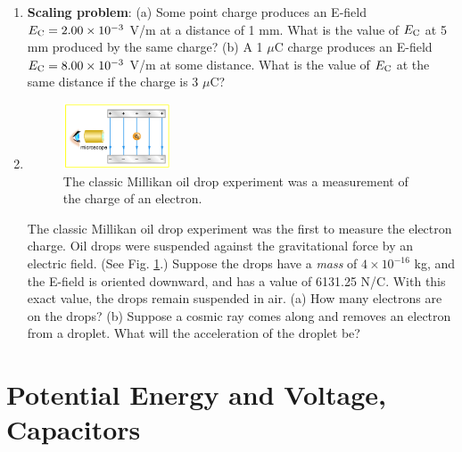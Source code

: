 \documentclass[10pt]{article}
\begin{document}
\begin{enumerate}
\item \textbf{Scaling problem}: (a) Some point charge produces an E-field $E_{\rm C} = 2.00 \times 10^{-3}$ V/m at a distance of 1 mm. What is the value of $E_{\rm C}$ at 5 mm produced by the same charge? (b) A 1 $\mu$C charge produces an E-field $E_{\rm C} = 8.00 \times 10^{-3}$ V/m at some distance.  What is the value of $E_{\rm C}$ at the same distance if the charge is 3 $\mu$C? \\ \vspace{1cm}
\item 
\begin{figure}
\centering
\includegraphics[width=0.3\textwidth]{figures/mill.jpeg}
\caption{\label{fig:mill} The classic Millikan oil drop experiment was a measurement of the charge of an electron.}
\end{figure}
The classic Millikan oil drop experiment was the first to measure the electron charge. Oil drops were suspended against the gravitational force by an electric field. (See Fig. \ref{fig:mill}.) Suppose the drops have a \textit{mass} of $4\times 10^{-16}$ kg, and the E-field is oriented downward, and has a value of 6131.25 N/C.  With this exact value, the drops remain suspended in air.  (a)  How many electrons are on the drops?  (b) Suppose a cosmic ray comes along and removes an electron from a droplet.  What will the acceleration of the droplet be? \\ \vspace{3cm}
\end{enumerate}

\section{Potential Energy and Voltage, Capacitors}
\end{document}

